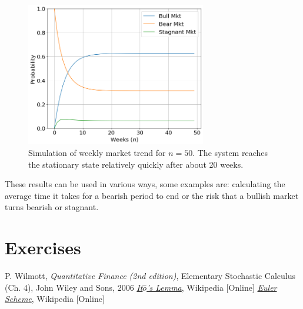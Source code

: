 \begin{figure}[!t]
	\centering
	\includegraphics[width=0.7\textwidth]{figures/markov_chain_sim}
	\caption{Simulation of weekly market trend for $n=50$. The system reaches the stationary state relatively quickly after about 20 weeks.}
	\label{fig:markov_chain_sim}
\end{figure}

These results can be used in various ways, some examples are: calculating the average time it takes for a bearish period to end or the risk that a bullish market turns bearish or stagnant.

\section*{Exercises}


\begin{thebibliography}{9}
 P. Wilmott, \emph{Quantitative Finance (2nd edition)}, Elementary Stochastic Calculus (Ch. 4), John Wiley and Sons, 2006 
\href{https://en.wikipedia.org/wiki/It\%C3\%B4\%27s_lemma}{\emph{It$\hat{o}$'s Lemma}}, Wikipedia [Online]
 \href{https://en.wikipedia.org/wiki/Euler_method}{\emph{Euler Scheme}}, Wikipedia [Online]
\end{thebibliography}









